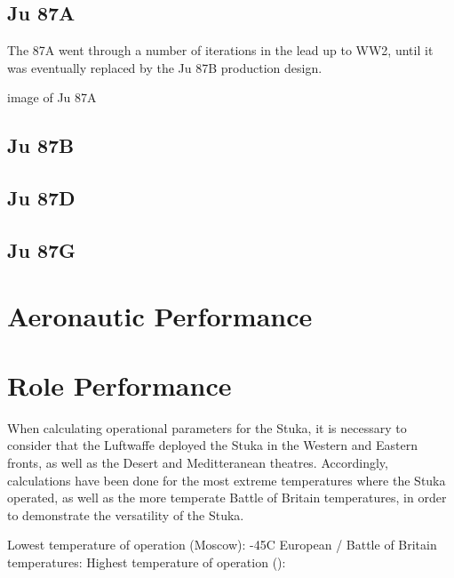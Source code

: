 \documentclass[a4paper, fontsize=11pt]{scrartcl} %
\begin{document}
\subsection{Ju 87A}
The 87A went through a number of iterations in the lead up to WW2,
until it was eventually replaced by the Ju 87B production design. 

{image of Ju 87A}
\subsection{Ju 87B}
\subsection{Ju 87D}
\subsection{Ju 87G}
\section{Aeronautic Performance}

\section{Role Performance}
When calculating operational parameters for the Stuka, it is necessary
to consider that the Luftwaffe deployed the Stuka in the Western and
Eastern fronts, as well as the Desert and Meditteranean theatres.
Accordingly, calculations have been done for the most extreme
temperatures where the Stuka operated, as well as the more temperate
Battle of Britain temperatures, in order to demonstrate the versatility
of the Stuka.

Lowest temperature of operation (Moscow): -45C \autocite{raus03}
European / Battle of Britain temperatures:
Highest temperature of operation ():


\printbibliography
\end{document}
